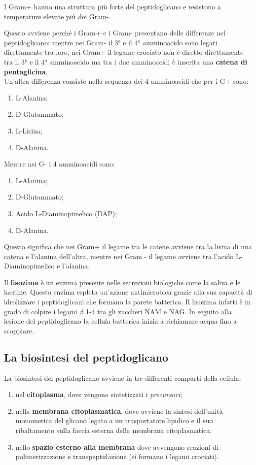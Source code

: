 \documentclass[11pt]{book}
\begin{document}
I Gram+ hanno una struttura più forte del peptidoglicano e resistono a temperature elevate più dei Gram-.

Questo avviene perché i Gram+ e i Gram- presentano delle differenze nel peptidoglicano: mentre nei Gram- il 3° e il 4° amminoacido sono legati direttamente tra loro, nei Gram+ il legame crociato non è diretto direttamente tra il 3° e il 4° amminoacido ma tra i due amminoacidi è inserita una \textbf{catena di pentaglicina}.\\
Un’altra differenza consiste nella sequenza dei 4 amminoacidi che per i G+ sono: 
\begin{enumerate}
\item L-Alanina;
\item D-Glutammato;
\item L-Lisina;
\item D-Alanina.
\end{enumerate}

Mentre nei G- i 4 amminoacidi sono:
\begin{enumerate}
\item L-Alanina;
\item D-Glutammato;
\item Acido L-Diaminopimelico (DAP);
\item D-Alanina.
\end{enumerate}

Questo significa che nei Gram+ il legame tra le catene avviene tra la lisina di una catena e l’alanina dell’altra, mentre nei Gram - il legame avviene tra l’acido L-Diaminopimelico e l’alanina.

\vspace{2em}
Il \textbf{lisozima} è un enzima presente nelle secrezioni biologiche come la saliva e le lacrime.
Questo enzima espleta un'azione antimicrobica grazie alla sua capacità di idrolizzare i peptidoglicani che formano la parete batterica. Il lisozima infatti è in grado di colpire i legami $\beta$ 1-4 tra gli zuccheri NAM e NAG.
In seguito alla lesione del peptidoglicano la cellula batterica inizia a richiamare acqua fino a scoppiare.


\subsection{La biosintesi del peptidoglicano}

La biosintesi del peptidoglicano avviene in tre differenti comparti della cellula:
\begin{enumerate}
\item nel \textbf{citoplasma}, dove vengono sintetizzati i \emph{precursori};
\item nella \textbf{membrana citoplasmatica}, dove avviene la sintesi dell’unità monomerica del glicano legato a un trasportatore lipidico e il suo ribaltamento sulla faccia esterna della membrana citoplasmatica;
\item nello \textbf{spazio esterno alla membrana} dove avvengono reazioni di polimerizzazione e transpeptidazione (si formano i legami crociati).
\end {enumerate}
\end{document}
